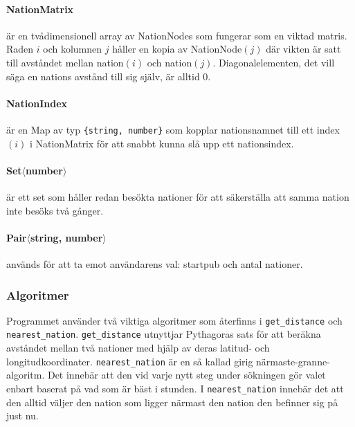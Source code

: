 \documentclass[a4paper, 12pt]{article}
\begin{document}
            \paragraph{NationMatrix}
                är en tvådimensionell array av NationNodes som fungerar som en viktad matris. Raden $i$ och kolumnen $j$ håller en kopia av NationNode$(j)$ där vikten är satt till avståndet mellan nation$(i)$ och nation$(j)$. Diagonalelementen, det vill säga en nations avstånd till sig själv, är alltid 0.

            \paragraph{NationIndex}
                är en Map av typ \texttt{\{string, number\}} som kopplar nationsnamnet till ett index $(i)$ i NationMatrix för att snabbt kunna slå upp ett nationsindex.

            \paragraph{Set$\langle$number$\rangle$}
                är ett set som håller redan besökta nationer för att säkerställa att samma nation inte besöks två gånger.
            
            \paragraph{Pair$\langle$string, number$\rangle$}
                används för att ta emot användarens val: startpub och antal nationer.

        \subsubsection{Algoritmer}
        \label{subsubsec: AL}
            Programmet använder två viktiga algoritmer som återfinns i \texttt{get\_distance} och \texttt{nearest\_nation}. \texttt{get\_distance} utnyttjar Pythagoras sats för att beräkna avståndet mellan två nationer med hjälp av deras latitud- och longitudkoordinater. \texttt{nearest\_nation} är en så kallad girig närmaste-granne-algoritm. Det innebär att den vid varje nytt steg under sökningen gör valet enbart baserat på vad som är bäst i stunden. I \texttt{nearest\_nation} innebär det att den alltid väljer den nation som ligger närmast den nation den befinner sig på just nu.
\end{document}
